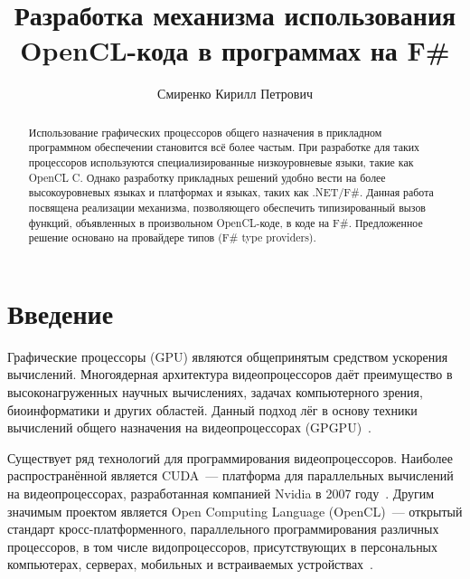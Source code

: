 \title{Разработка механизма использования OpenCL-кода в программах на F\#}


\author{Смиренко Кирилл Петрович}



\maketitle

  \begin{abstract}
    Использование графических процессоров общего назначения в прикладном программном обеспечении становится всё более частым. 
    При разработке для таких процессоров используются специализированные низкоуровневые языки, такие как OpenCL C.
    Однако разработку прикладных решений удобно вести на более высокоуровневых языках и платформах и языках, таких как .NET/F\#. 
    Данная работа посвящена реализации механизма, позволяющего обеспечить типизированный вызов функций, объявленных в произвольном OpenCL-коде, в коде на F\#. 
    Предложенное решение основано на провайдере типов (F\# type providers).
  \end{abstract}


\section*{Введение}
Графические процессоры (GPU) являются общепринятым средством ускорения вычислений. Многоядерная архитектура видеопроцессоров даёт преимущество в высоконагруженных научных вычислениях, задачах компьютерного зрения, биоинформатики и других областей. Данный подход лёг в основу техники вычислений общего назначения на видеопроцессорах (GPGPU)~\cite{CUDA_to_OpenCL, GPGPU_1}.

Существует ряд технологий для программирования видеопроцессоров. Наиболее распространённой является CUDA~--- платформа для параллельных вычислений на видеопроцессорах, разработанная компанией Nvidia в 2007 году~\cite{CUDA}. Другим значимым проектом является Open Computing Language (OpenCL)~--- открытый стандарт кросс-платформенного, параллельного программирования различных процессоров, в том числе видопроцессоров, присутствующих в персональных компьютерах, серверах, мобильных и встраиваемых устройствах~\cite{OpenCL}.

